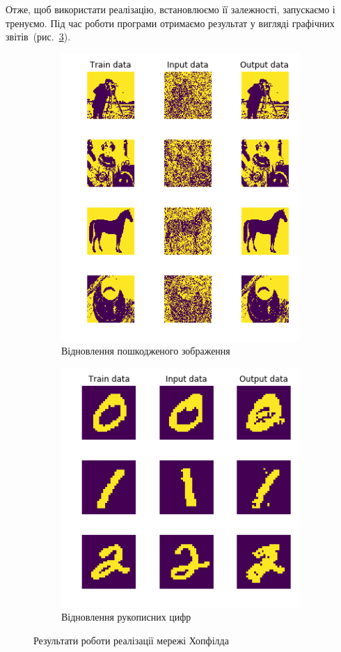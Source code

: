 \documentclass[
  a4paper,
  oneside,
  BCOR = 10mm,
  DIV = 12,
  12pt,
  headings = normal,
]{scrartcl}
\newlength{\gridunitwidth}
\begin{document}
    Отже, щоб використати реалізацію, встановлюємо її залежності, запускаємо і тренуємо. Під час роботи програми отримаємо результат у вигляді графічних звітів~(рис.~\ref{fig:image-recovery-py}).

    \begin{figure}[!htb]
      \begin{subfigure}[t]{6\gridunitwidth - 0.5\gridunitwidth}
        \centering
        \includegraphics[width = 6\gridunitwidth]{./assets/y04s02-ai-homework-01-s02-report-p06.png}
        \caption{Відновлення пошкодженого зображення}
        \label{subfig:image-recovery-py-01}
      \end{subfigure}%
      \hspace{1\gridunitwidth}
      \begin{subfigure}[t]{6\gridunitwidth - 0.5\gridunitwidth}
        \centering
        \includegraphics[width = 6\gridunitwidth]{./assets/y04s02-ai-homework-01-s02-report-p07.png}
        \caption{Відновлення рукописних цифр}
        \label{subfig:image-recovery-py-02}
      \end{subfigure}%
      \caption{Результати роботи реалізації мережі Хопфілда}
      \label{fig:image-recovery-py}
    \end{figure}
\end{document}
